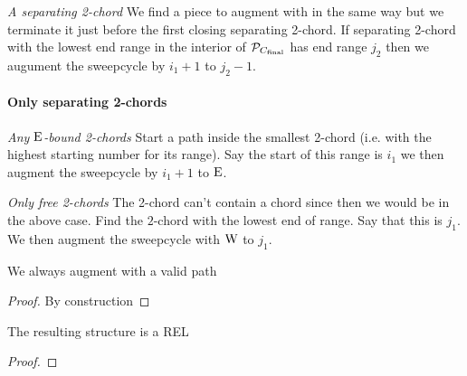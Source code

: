       \emph{A separating 2-chord}
      We find a piece to augment with in the same way  but we terminate it just before the first closing separating 2-chord. If separating 2-chord with the lowest end range in the interior of $\P_{C_\text{final}}$ has end range $j_2$ then we augument the sweepcycle by  $i_1 +1$ to $j_2 -1$.

      \paragraph{Only separating 2-chords}
      \emph{Any $\pE$-bound 2-chords} 
      Start a path inside the smallest 2-chord (i.e. with the highest starting number for its range). Say the start of this range is $i_1$ we then augment the sweepcycle by $i_1 +1$ to $\pE$.

      \emph{Only free 2-chords}
      The 2-chord can't contain a chord since then we would be in the above case.
      Find the $2$-chord with the lowest end of range. Say that this is $j_1$. We then augment the sweepcycle with $\pW$ to $j_1$.

      \begin{lemma}
        We always augment with a valid path
      \end{lemma}
      \begin{proof}
        By construction
      \end{proof}

      \begin{lemma}
        \label{lm:sweep:REL}
        The resulting structure is a REL
      \end{lemma}

      \begin{proof}

      \end{proof}


